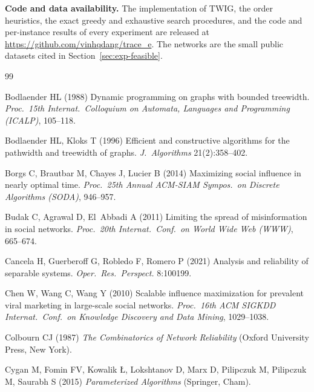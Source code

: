 \documentclass[11pt]{article}
\theoremstyle{definition}
\theoremstyle{remark}
\begin{document}
\textbf{Code and data availability.} The implementation of TWIG, the order heuristics, the exact greedy and exhaustive search procedures, and the code and per-instance results of every experiment are released at \url{https://github.com/vinhqdang/trace_e}. The networks are the small public datasets cited in Section~\ref{sec:exp-feasible}.

\begin{thebibliography}{99}
\providecommand{\natexlab}[1]{#1}
\providecommand{\url}[1]{\texttt{#1}}
\providecommand{\urlprefix}{URL }

Bodlaender HL (1988) Dynamic programming on graphs with bounded treewidth.
  \emph{Proc.\ 15th Internat.\ Colloquium on Automata, Languages and
  Programming (ICALP)}, 105--118.

Bodlaender HL, Kloks T (1996) Efficient and constructive algorithms for the
  pathwidth and treewidth of graphs. \emph{J.\ Algorithms} 21(2):358--402.

Borgs C, Brautbar M, Chayes J, Lucier B (2014) Maximizing social influence in
  nearly optimal time. \emph{Proc.\ 25th Annual ACM-SIAM Sympos.\ on Discrete
  Algorithms (SODA)}, 946--957.

Budak C, Agrawal D, El~Abbadi A (2011) Limiting the spread of misinformation
  in social networks. \emph{Proc.\ 20th Internat.\ Conf.\ on World Wide Web
  (WWW)}, 665--674.

Cancela H, Guerberoff G, Robledo F, Romero P (2021) Analysis and reliability of
  separable systems. \emph{Oper.\ Res.\ Perspect.} 8:100199.

Chen W, Wang C, Wang Y (2010) Scalable influence maximization for prevalent
  viral marketing in large-scale social networks. \emph{Proc.\ 16th ACM SIGKDD
  Internat.\ Conf.\ on Knowledge Discovery and Data Mining}, 1029--1038.

Colbourn CJ (1987) \emph{The Combinatorics of Network Reliability} (Oxford
  University Press, New York).

Cygan M, Fomin FV, Kowalik {\L}, Lokshtanov D, Marx D, Pilipczuk M,
  Pilipczuk M, Saurabh S (2015) \emph{Parameterized Algorithms} (Springer,
  Cham).


\end{thebibliography}
\end{document}
